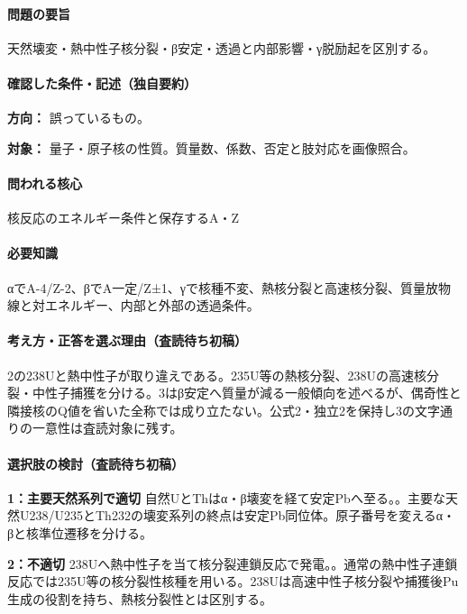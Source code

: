 \paragraph{問題の要旨} 天然壊変・熱中性子核分裂・β安定・透過と内部影響・γ脱励起を区別する。

\paragraph{確認した条件・記述（独自要約）}\mbox{}\par

\noindent\textbf{方向：} 誤っているもの。\par

\noindent\textbf{対象：} 量子・原子核の性質。質量数、係数、否定と肢対応を画像照合。\par

\paragraph{問われる核心} 核反応のエネルギー条件と保存するA・Z

\paragraph{必要知識} αでA-4/Z-2、βでA一定/Z±1、γで核種不変、熱核分裂と高速核分裂、質量放物線と対エネルギー、内部と外部の透過条件。

\paragraph{考え方・正答を選ぶ理由（査読待ち初稿）} 2の238Uと熱中性子が取り違えである。235U等の熱核分裂、238Uの高速核分裂・中性子捕獲を分ける。3はβ安定へ質量が減る一般傾向を述べるが、偶奇性と隣接核のQ値を省いた全称では成り立たない。公式2・独立2を保持し3の文字通りの一意性は査読対象に残す。

\paragraph{選択肢の検討（査読待ち初稿）}\mbox{}\par

\noindent\textbf{1：主要天然系列で適切} 自然UとThはα・β壊変を経て安定Pbへ至る。。主要な天然U238/U235とTh232の壊変系列の終点は安定Pb同位体。原子番号を変えるα・βと核準位遷移を分ける。\par

\noindent\textbf{2：不適切} 238Uへ熱中性子を当て核分裂連鎖反応で発電。。通常の熱中性子連鎖反応では235U等の核分裂性核種を用いる。238Uは高速中性子核分裂や捕獲後Pu生成の役割を持ち、熱核分裂性とは区別する。\par

